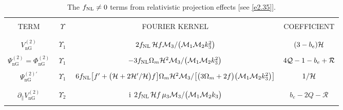 
%
\begin{sidewaystable}[!ph] 
\caption{{The $f_\text{NL} \neq 0$ terms from relativistic projection effects [see \eqref{e2.35}].}} \label{tabc3}
\begin{tabular}{| c | c | c | c |} 
\hline 
&  &  & \\
TERM & $~~\Upsilon~~$ & FOURIER KERNEL  & COEFFICIENT \\ 
&  &  & \\ \hline \hline
&  &  & \\ 
$V^{(2)}_{\mathrm{nG}}$ & $\Upsilon_{1}$ & ${2f_\text{NL}\, \mathcal{H} f {\cal M}_3/\big({\cal M}_1 {\cal M}_2 k_3^2\big)}$ & $(3-b_{e})\mathcal{H}$ \\ 
&  &  & \\
$\Psi^{(2)}_{\mathrm{nG}}=\Phi^{(2)}_{\mathrm{nG}}$ & $\Upsilon_{1}$ & ${-3f_\text{NL}\Omega_m \mathcal{H}^{2}{\cal M}_3/\big({\cal M}_1 {\cal M}_2 k_3^2\big)}$ & ${4{\cal Q}-1-b_e+{\cal R} }$ \\ 
&  &  & \\
${\Psi^{(2)\prime}_{\mathrm{nG}}}$ & $\Upsilon_{1}$ & ${6f_\text{NL}\big[f' +\big(\mathcal{H}+2\mathcal{H}'/\mathcal{H} \big)f \big]\Omega_m \mathcal{H}^{2}{\cal M}_3/\big[\big( 3\Omega_m+2f\big) \big({\cal M}_1 {\cal M}_2 k_3^2\big)\big]}$ & $1/\mathcal{H}$ \\ 
&  &  & \\
\hline 
&  &  & \\
$ \partial_{\parallel}V^{(2)}_{\mathrm{nG}}$ & $\Upsilon_2$ & $\mathrm{i\,}\;{2f_\text{NL}\, \mathcal{H} f \,\mu_3{\cal M}_3/\big({\cal M}_1 {\cal M}_2 k_3\big)}$ & $b_{e}-2Q-\mathcal{R}$ \\ 
&  &  & \\
\hline 

\end{tabular}
\end{sidewaystable}
